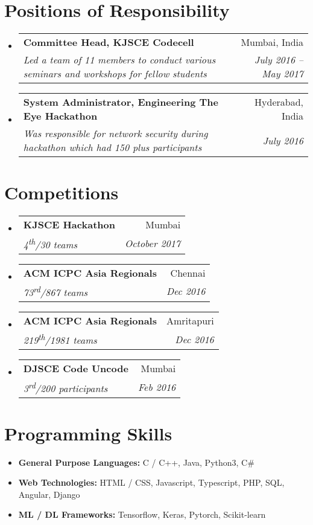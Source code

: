 \documentclass[letterpaper,8pt]{article}
\makeatletter
\newcommand{\resumeSubheading}[4]{
  \vspace{-1pt}\item
    \begin{tabular*}{0.97\textwidth}{l@{\extracolsep{\fill}}r}
      \textbf{#1} & #2 \\
      \textit{\small#3} & \textit{\small #4} \\
    \end{tabular*}\vspace{-5pt}
}
\newcommand{\resumeSubHeadingListStart}{\begin{itemize}[leftmargin=*]}
\newcommand{\resumeSubHeadingListEnd}{\end{itemize}}
\makeatother
\begin{document}
\section{Positions of Responsibility}
  \resumeSubHeadingListStart
    \resumeSubheading
      {Committee Head, KJSCE Codecell}{Mumbai, India}
      {Led a team of 11 members to conduct various seminars and workshops for fellow students}{July 2016 -- May 2017}
    \resumeSubheading
      {System Administrator, Engineering The Eye Hackathon}{Hyderabad, India}
      {Was responsible for network security during hackathon which had 150 plus participants}{July 2016}
  \resumeSubHeadingListEnd
  
\section{Competitions}
  \resumeSubHeadingListStart
  	\resumeSubheading{KJSCE Hackathon}{Mumbai}{4\textsuperscript{th}/30 teams}{October 2017}
    \resumeSubheading{ACM ICPC Asia Regionals}{Chennai}{73\textsuperscript{rd}/867 teams}{Dec 2016}
    \resumeSubheading{ACM ICPC Asia Regionals}{Amritapuri}{219\textsuperscript{th}/1981 teams}{Dec 2016}
    \resumeSubheading{DJSCE Code Uncode}{Mumbai}{3\textsuperscript{rd}/200 participants}{Feb 2016}
  \resumeSubHeadingListEnd

\section{Programming Skills}
  \resumeSubHeadingListStart
    \item{
      \textbf{General Purpose Languages}{\textbf{:} C / C++, Java, Python3, C\#}
      \hfill
    }
    \vspace{-4pt}
    \item{
      \textbf{Web Technologies}{\textbf{:} HTML / CSS, Javascript, Typescript, PHP, SQL, Angular, Django}
      \hfill
    }
    \vspace{-4pt}
    \item{
      \textbf{ML / DL Frameworks}{\textbf{:} Tensorflow, Keras, Pytorch, Scikit-learn}
      \hfill
    }
  \resumeSubHeadingListEnd
\end{document}
